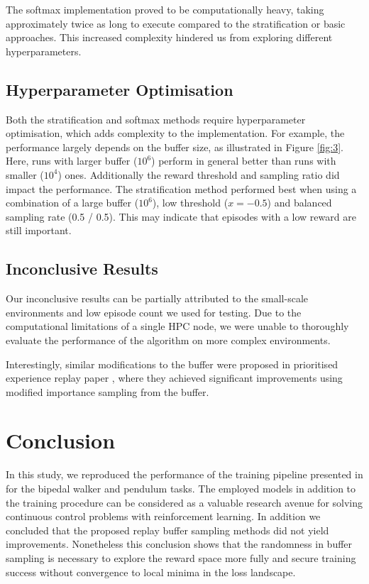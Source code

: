 \documentclass{article}
\begin{document}
The softmax implementation proved to be computationally heavy, taking approximately twice as long to execute compared to the stratification or basic approaches. This increased complexity hindered us from exploring different hyperparameters.

\subsection{Hyperparameter Optimisation}
Both the stratification and softmax methods require hyperparameter optimisation, which adds complexity to the implementation. For example, the performance largely depends on the buffer size, as illustrated in Figure \ref{fig:3}. Here, runs with larger buffer ($10^6$) perform in general better than runs with smaller ($10^4$) ones. Additionally the reward threshold and sampling ratio did impact the performance. The stratification method performed best when using a combination of a large buffer ($10^6$), low threshold ($x = -0.5$) and balanced sampling rate (0.5 / 0.5). This may indicate that episodes with a low reward are still important.

\subsection{Inconclusive Results}
Our inconclusive results can be partially attributed to the small-scale environments and low episode count we used for testing. Due to the computational limitations of a single HPC node, we were unable to thoroughly evaluate the performance of the algorithm on more complex environments.

Interestingly, similar modifications to the buffer were proposed in prioritised experience replay paper \cite{prioritizedreplay}, where they achieved significant improvements using modified importance sampling from the buffer.

\section{Conclusion}

In this study, we reproduced the performance of the training pipeline presented in \cite{lillicrap2015continuous} for the bipedal walker and pendulum tasks. The employed models in addition to the training procedure can be considered as a valuable research avenue for solving continuous control problems with reinforcement learning. In addition we concluded that the proposed replay buffer sampling methods did not yield improvements.
Nonetheless this conclusion shows that the randomness in buffer sampling is necessary to explore the reward space more fully and secure training success without convergence to local minima in the loss landscape.

\printbibliography
\end{document}
